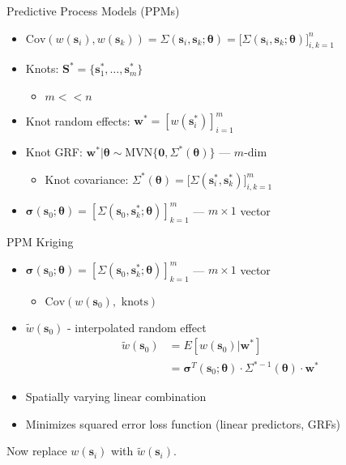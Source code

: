 \documentclass{beamer}
\begin{document}
\begin{frame}{Predictive Process Models (PPMs) }{\citep{Banerjee2008}} %
\begin{itemize}
\addtolength{\itemsep}{1\baselineskip}
\item $\text{Cov}\left(w(\pmb{s}_{i}), w(\pmb{s}_{k}) \right) = \Sigma(\pmb{s}_{i}, \pmb{s}_{k}; \pmb{\theta})= \big[\Sigma(\pmb{s}_{i}, \pmb{s}_{k}; \pmb{\theta}) \big]_{i,k=1}^{n}$
\item Knots: $\pmb{S}^{*} = \{\pmb{s}_{1}^{*}, \dots, \pmb{s}_{m}^{*}\}$
  \begin{itemize}
  \item $m < < n$
  \end{itemize}
\item Knot random effects: $\pmb{w}^{*} = \left[w(\pmb{s}_{i}^{*})\right]_{i=1}^{m}$
\item Knot GRF: $\pmb{w}^{*}|\pmb{\theta} \sim \text{MVN}\{\pmb{0}, \Sigma^{*}(\pmb{\theta})\}$ --- $m$-dim \\
  \begin{itemize}
  \addtolength{\itemsep}{0.5\baselineskip}
  \item Knot covariance: $\Sigma^{*}(\pmb{\theta}) = \big[\Sigma(\pmb{s}_{i}^{*}, \pmb{s}_{k}^{*})\big]_{i,k = 1}^{m}$
  \end{itemize}
\item $\pmb{\sigma}(\pmb{s}_{0};\pmb{\theta}) = \left[\Sigma(\pmb{s}_{0}, \pmb{s}_{k}^{*}; \pmb{\theta})\right]_{k = 1}^{m}$ --- $m \times 1$ vector
\end{itemize}
\end{frame}

\begin{frame}{PPM Kriging} %
\begin{itemize}
\addtolength{\itemsep}{0.5\baselineskip}
\item $\pmb{\sigma}(\pmb{s}_{0};\pmb{\theta}) = \left[\Sigma(\pmb{s}_{0}, \pmb{s}_{k}^{*}; \pmb{\theta})\right]_{k = 1}^{m}$ --- $m \times 1$ vector
    \begin{itemize}
    \addtolength{\itemsep}{0.5\baselineskip}
    \item $\text{Cov}(w(\pmb{s}_{0}), \text{ knots})$
    \end{itemize}
\item  $\widetilde{w}(\pmb{s}_{0})$ - interpolated random effect
        \begin{align*}
        \widetilde{w}(\pmb{s}_{0}) &= E[w(\pmb{s}_{0})|\pmb{w}^{*}] \\
        &= \pmb{\sigma}^{T}(\pmb{s}_{0};\pmb{\theta}) \cdot \Sigma^{*-1}(\pmb{\theta}) \cdot \pmb{w}^{*}
        \end{align*}
\item Spatially varying linear combination
\item Minimizes squared error loss function (linear predictors, GRFs)
\end{itemize}

Now replace $w(\pmb{s}_{i})$ with $\widetilde{w}(\pmb{s}_{i})$.
\end{frame}
\end{document}
